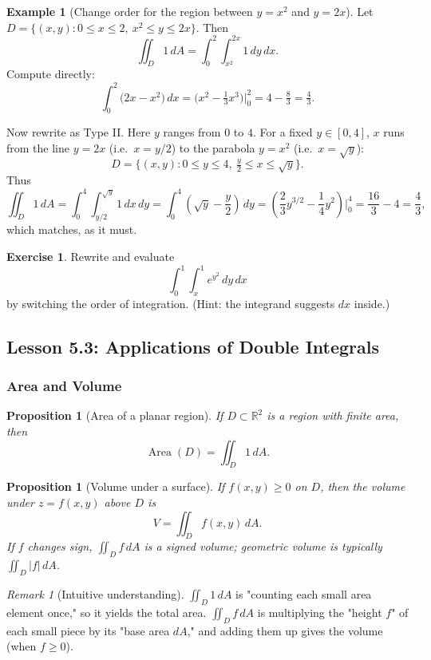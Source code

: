 \documentclass[12pt]{article}
\numberwithin{equation}{section}
\newcommand{\RR}{\mathbb{R}}
\theoremstyle{plain}
\newtheorem{proposition}[theorem]{Proposition}
\theoremstyle{definition}
\newtheorem{example}[theorem]{Example}
\newtheorem{exercise}[theorem]{Exercise}
\theoremstyle{remark}
\newtheorem{remark}[theorem]{Remark}
\begin{document}
\begin{example}[Change order for the region between $y=x^2$ and $y=2x$]
Let $D=\{(x,y):0\le x\le 2,\ x^2\le y\le 2x\}$.
Then
\[
\iint_D 1\,dA=\int_{0}^{2}\int_{x^2}^{2x} 1\,dy\,dx.
\]
Compute directly:
\[
\int_{0}^{2}\big(2x-x^2\big)\,dx=\Big(x^2-\tfrac13 x^3\Big)\Big|_{0}^{2}=4-\tfrac83=\tfrac{4}{3}.
\]

Now rewrite as Type II. Here $y$ ranges from $0$ to $4$. For a fixed $y\in[0,4]$, $x$ runs from the line $y=2x$ (i.e.\ $x=y/2$) to the parabola $y=x^2$ (i.e.\ $x=\sqrt{y}$):
\[
D=\{(x,y):0\le y\le 4,\ \tfrac{y}{2}\le x\le \sqrt{y}\}.
\]
Thus
\[
\iint_D 1\,dA=\int_{0}^{4}\int_{y/2}^{\sqrt{y}} 1\,dx\,dy
=\int_{0}^{4}\left(\sqrt{y}-\frac{y}{2}\right)\,dy
=\left(\frac{2}{3}y^{3/2}-\frac14 y^2\right)\Big|_{0}^{4}
=\frac{16}{3}-4=\frac{4}{3},
\]
which matches, as it must.
\end{example}

\begin{exercise}
Rewrite and evaluate
\[
\int_{0}^{1}\int_{x}^{1} e^{y^2}\,dy\,dx
\]
by switching the order of integration. (Hint: the integrand suggests $dx$ inside.)
\end{exercise}

\subsection{Lesson 5.3: Applications of Double Integrals}

\subsubsection{Area and Volume}

\begin{proposition}[Area of a planar region]\label{prop:area}
If $D\subset\RR^2$ is a region with finite area, then
\[
\operatorname{Area}(D)=\iint_D 1\,dA.
\]
\end{proposition}

\begin{proposition}[Volume under a surface]\label{prop:volume-under}
If $f(x,y)\ge 0$ on $D$, then the volume under $z=f(x,y)$ above $D$ is
\[
V=\iint_D f(x,y)\,dA.
\]
If $f$ changes sign, $\iint_D f\,dA$ is a \emph{signed volume}; geometric volume is typically $\iint_D |f|\,dA$.
\end{proposition}

\begin{remark}[Intuitive understanding]
$\iint_D 1\,dA$ is "counting each small area element once," so it yields the total area.  
$\iint_D f\,dA$ is multiplying the "height $f$" of each small piece by its "base area $dA$," and adding them up gives the volume (when $f\ge0$).
\end{remark}
\end{document}
